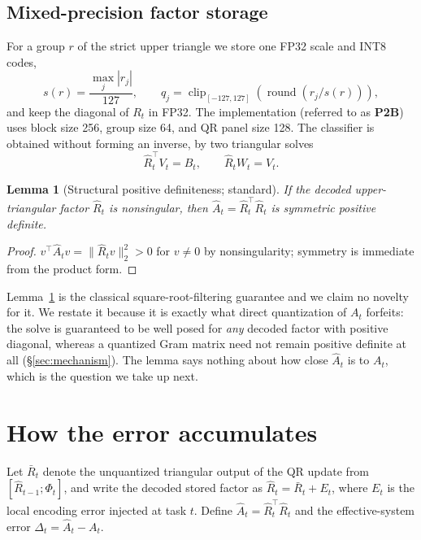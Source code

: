 \documentclass{article}
\newtheorem{lemma}{Lemma}
\begin{document}
\subsection{Mixed-precision factor storage}

For a group $r$ of the strict upper triangle we store one FP32 scale and INT8
codes,
\begin{equation}
s(r)=\frac{\max_j|r_j|}{127},\qquad
q_j=\operatorname{clip}_{[-127,127]}\!\left(\operatorname{round}(r_j/s(r))\right),
\label{eq:quantization}
\end{equation}
and keep the diagonal of $R_t$ in FP32. The implementation (referred to as
\textbf{P2B}) uses block size 256, group size 64, and QR panel size 128. The
classifier is obtained without forming an inverse, by two triangular solves
\begin{equation}
\widehat R_t^{\top}V_t=B_t,\qquad \widehat R_tW_t=V_t .
\label{eq:triangular-solve}
\end{equation}

\begin{lemma}[Structural positive definiteness; standard]
\label{lem:spd}
If the decoded upper-triangular factor $\widehat R_t$ is nonsingular, then
$\widehat A_t=\widehat R_t^{\top}\widehat R_t$ is symmetric positive definite.
\end{lemma}
\begin{proof}
$v^{\top}\widehat A_tv=\|\widehat R_tv\|_2^2>0$ for $v\neq0$ by
nonsingularity; symmetry is immediate from the product form.
\end{proof}

Lemma~\ref{lem:spd} is the classical square-root-filtering guarantee
\citep{bierman1977,kailath2000} and we claim no novelty for it. We restate it
because it is exactly what direct quantization of $A_t$ forfeits: the solve is
guaranteed to be well posed for \emph{any} decoded factor with positive
diagonal, whereas a quantized Gram matrix need not remain positive definite at
all (\S\ref{sec:mechanism}). The lemma says nothing about how close
$\widehat A_t$ is to $A_t$, which is the question we take up next.

\section{How the error accumulates}
\label{sec:analysis}

Let $\bar R_t$ denote the unquantized triangular output of the QR update from
$[\widehat R_{t-1};\Phi_t]$, and write the decoded stored factor as
$\widehat R_t=\bar R_t+E_t$, where $E_t$ is the local encoding error injected
at task $t$. Define $\widehat A_t=\widehat R_t^{\top}\widehat R_t$ and the
effective-system error $\Delta_t=\widehat A_t-A_t$.
\end{document}
